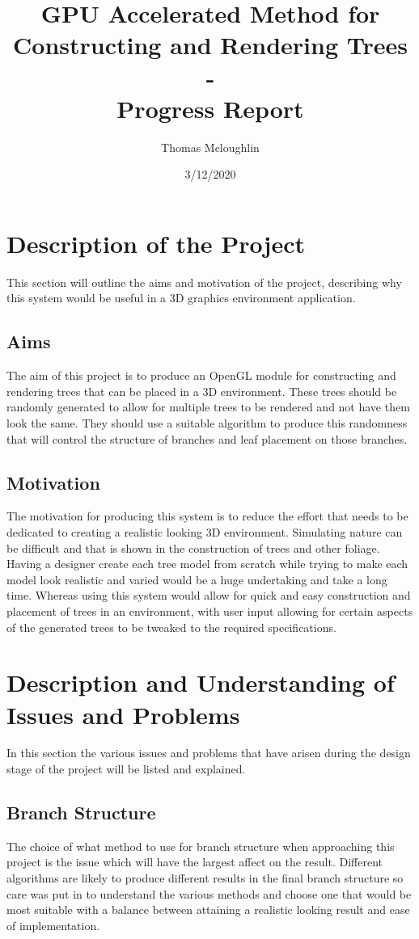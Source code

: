 \documentclass[progress]{cmpreport}
\title{GPU Accelerated Method for Constructing and Rendering Trees 
        \\ - \\ 
        Progress Report}
\author{Thomas Mcloughlin}
\date{3/12/2020}
\begin{document}
\maketitle

\section{Description of the Project}
This section will outline the aims and motivation of the project, describing why this system 
would be useful in a 3D graphics environment application.

\subsection{Aims}
The aim of this project is to produce an OpenGL module for constructing and rendering trees 
that can be placed in a 3D environment. These trees should be randomly generated to allow 
for multiple trees to be rendered and not have them look the same. They should use a suitable 
algorithm to produce this randomness that will control the structure of branches and leaf 
placement on those branches.

\subsection{Motivation}
The motivation for producing this system is to reduce the effort that needs to be dedicated to 
creating a realistic looking 3D environment. Simulating nature can be difficult and that is 
shown in the construction of trees and other foliage. Having a designer create each tree model 
from scratch while trying to make each model look realistic and varied would be a huge 
undertaking and take a long time. Whereas using this system would allow for quick and easy 
construction and placement of trees in an environment, with user input allowing for certain 
aspects of the generated trees to be tweaked to the required specifications.

\section{Description and Understanding of Issues and Problems}
In this section the various issues and problems that have arisen during the design stage of the 
project will be listed and explained.

\subsection{Branch Structure}
The choice of what method to use for branch structure when approaching this project is the 
issue which will have the largest affect on the result. Different algorithms are likely to 
produce different results in the final branch structure so care was put in to understand the 
various methods and choose one that would be most suitable with a balance between attaining a 
realistic looking result and ease of implementation.
\end{document}
